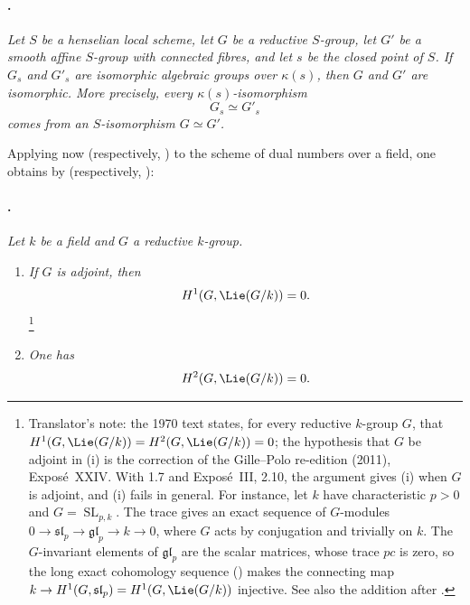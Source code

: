 
\paragraph{.}
\emph{Let \(S\) be a henselian local scheme, let \(G\) be a
reductive \(S\)-group, let \(G'\) be a smooth affine \(S\)-group with
connected fibres, and let \(s\) be the closed point of \(S\). If
\(G_s\) and \(G'_s\) are isomorphic algebraic groups over
\(\kappa(s)\), then \(G\) and \(G'\) are isomorphic. More precisely,
every \(\kappa(s)\)-isomorphism}
\[
  G_s\simeq G'_s
\]
\emph{comes from an \(S\)-isomorphism \(G\simeq G'\).}

Applying now  \textup{(respectively, )} to the
scheme of dual numbers over a field, one obtains by 
\textup{(respectively, )}:

\paragraph{.}
\emph{Let \(k\) be a field and \(G\) a reductive \(k\)-group.}
\begin{enumerate}
\item[\SGAInlineRefTarget{sga3:xxiv:1.13:item:i}(i)] \emph{If \(G\) is adjoint, then}
\[
  H^1(G,\Lie(G/k))=0.
\]
\footnote{Translator's note: the 1970 text states, for every reductive \(k\)-group \(G\),
that \(H^1(G,\Lie(G/k))=H^2(G,\Lie(G/k))=0\); the hypothesis that \(G\) be adjoint in (i)
is the correction of the Gille--Polo re-edition (2011), Exposé~XXIV. With 1.7 and Exposé~III,
2.10, the argument gives (i) when \(G\) is adjoint, and (i) fails in general. For instance, let
\(k\) have characteristic \(p>0\) and \(G=\operatorname{SL}_{p,k}\). The trace gives an exact
sequence of \(G\)-modules \(0\to\mathfrak{sl}_p\to\mathfrak{gl}_p\to k\to0\), where \(G\) acts
by conjugation and trivially on \(k\). The \(G\)-invariant elements of \(\mathfrak{gl}_p\) are
the scalar matrices, whose trace \(pc\) is zero, so the long exact cohomology sequence
\textup{()} makes the connecting map
\(k\to H^1(G,\mathfrak{sl}_p)=H^1(G,\Lie(G/k))\) injective. See also the addition after
.}
\item[\SGAInlineRefTarget{sga3:xxiv:1.13:item:ii}(ii)] \emph{One has}
\[
  H^2(G,\Lie(G/k))=0.
\]
\end{enumerate}

